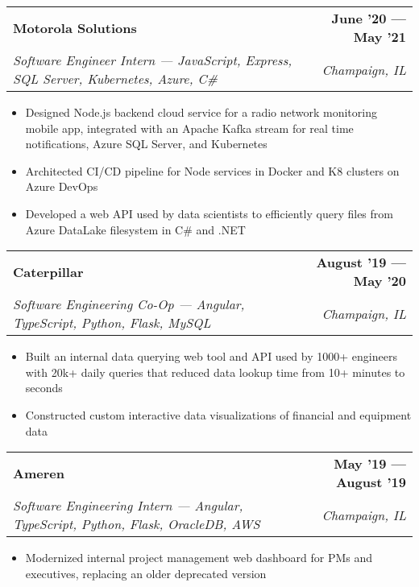 \documentclass[letterpaper,11pt]{article}
\makeatletter
\newcommand{\resumeItem}[1]{
  \item\small{
    {#1 \vspace{-1pt}}
  }
}
\newcommand{\resumeSubheadingSmall}[4]{
  \vspace{-0pt}
  \item
    \begin{tabular*}{1\textwidth}[t]{l@{\extracolsep{\fill}}r}
      \large{\textbf{#1}} & \small{\color{main}\textbf{#2}} \\
      \textit{\footnotesize#3} & \textit{\footnotesize#4} \\
    \end{tabular*}\vspace{-7pt}
}
\newcommand{\resumeSubSubheading}[2]{
    \item
    \begin{tabular*}{0.97\textwidth}{l@{\extracolsep{\fill}}r}
      \textit{\small#1} & \textit{\small #2} \\
    \end{tabular*}\vspace{-7pt}
}
\newcommand{\resumeSubHeadingListEnd}{\end{itemize}}
\newcommand{\resumeItemListStart}{\begin{itemize}}
\newcommand{\resumeItemListEnd}{\end{itemize}\vspace{0pt}}
\makeatother
\begin{document}

    \resumeSubheadingSmall
      {Motorola Solutions} %
      {June '20 --- May '21} %
      {Software Engineer Intern --- JavaScript, Express, SQL Server, Kubernetes, Azure, C\#} %
      {Champaign, IL} %
      \resumeItemListStart
        \resumeItem{Designed Node.js backend cloud service for a radio network monitoring mobile app, integrated with an Apache Kafka stream for real time notifications, Azure SQL Server, and Kubernetes }
        \resumeItem{Architected CI/CD pipeline for Node services in Docker and K8 clusters on Azure DevOps}
        \resumeItem{Developed a web API used by data scientists to efficiently query files from Azure DataLake filesystem in C\# and .NET}
    \resumeItemListEnd

    \resumeSubheadingSmall
      {Caterpillar} %
      {August '19 --- May '20} %
      {Software Engineering Co-Op --- Angular, TypeScript, Python, Flask, MySQL} %
      {Champaign, IL} %
      \resumeItemListStart
        \resumeItem{Built an internal data querying web tool and API used by 1000+ engineers with 20k+ daily queries that reduced data lookup time from 10+ minutes to seconds}
        \resumeItem{Constructed custom interactive data visualizations of financial and equipment data}
      \resumeItemListEnd

    \resumeSubheadingSmall
      {Ameren} %
      {May '19 --- August '19} %
      {Software Engineering Intern --- Angular, TypeScript, Python, Flask, OracleDB, AWS} %
      {Champaign, IL} %
      \resumeItemListStart
        \resumeItem{Modernized internal project management web dashboard for PMs and executives, replacing an older deprecated version}
      \resumeItemListEnd
\end{document}
